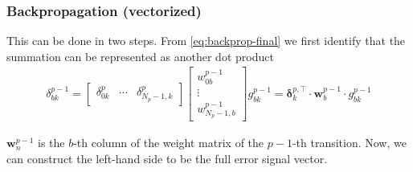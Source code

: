 \subsubsection{Backpropagation (vectorized)}
This can be done in two steps. From \eqref{eq:backprop-final} we first identify that the summation can be represented as another dot product
\begin{align}
	\label{eq:backprop-vectorized}
	\delta_{bk}^{p-1}=\begin{bmatrix}\delta_{0k}^{p}&\cdots&\delta_{N_{p}-1,k}^{p}\end{bmatrix}\begin{bmatrix}
		w_{0b}^{p-1}\\ \vdots \\ w_{N_{p}-1,b}^{p-1}
	\end{bmatrix} g_{bk}^{p-1}=\boldsymbol{\delta}_k^{p,\top}\cdot \boldsymbol{w}_b^{p-1}\cdot  g_{bk}^{p-1}
\end{align}

$\boldsymbol{w}_n^{p-1}$ is the $b$-th column of the weight matrix of the $p-1$-th transition. Now, we can construct the left-hand side to be the full error signal vector.

